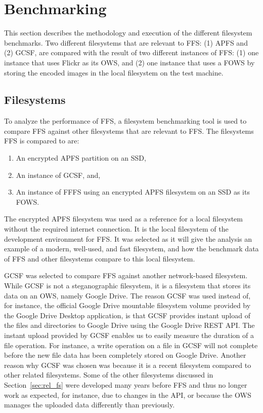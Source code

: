 \section{Benchmarking}
This section describes the methodology and execution of the different filesystem benchmarks. Two different filesystems that are relevant to \gls{FFS}: (1) \gls{APFS} and (2) \gls{GCSF}, are compared with the result of two different instances of \gls{FFS}: (1) one instance that uses Flickr as its \gls{OWS}, and (2) one instance that uses a \gls{FOWS} by storing the encoded images in the local filesystem on the test machine. 

\subsection{Filesystems}
To analyze the performance of \gls{FFS}, a filesystem benchmarking tool is used to compare \gls{FFS} against other filesystems that are relevant to \gls{FFS}. The filesystems \gls{FFS} is compared to are:
\begin{enumerate}
	\item An encrypted \gls{APFS} partition on an SSD,
	\item An instance of \gls{GCSF}, and,
	\item An instance of \gls{FFFS} using an encrypted \gls{APFS} filesystem on an SSD as its \gls{FOWS}.
\end{enumerate}
The encrypted \gls{APFS} filesystem was used as a reference for a local filesystem without the required internet connection. It is the local filesystem of the development environment for \gls{FFS}. It was selected as it will give the analysis an example of a modern, \mbox{well-used}, and fast filesystem, and how the benchmark data of \gls{FFS} and other filesystems compare to this local filesystem.

\gls{GCSF} was selected to compare \gls{FFS} against another \mbox{network-based} filesystem. While \gls{GCSF} is not a steganographic filesystem, it is a filesystem that stores its data on an \gls{OWS}, namely Google Drive. The reason \gls{GCSF} was used instead of, for instance, the official Google Drive mountable filesystem volume provided by the Google Drive Desktop application, is that \gls{GCSF} provides instant upload of the files and directories to Google Drive using the Google Drive REST \gls{API}. The instant upload provided by \gls{GCSF} enables us to easily measure the duration of a file operation. For instance, a write operation on a file in \gls{GCSF} will not complete before the new file data has been completely stored on Google Drive. Another reason why \gls{GCSF} was chosen was because it is a recent filesystem compared to other related filesystems. Some of the other filesystems discussed in Section~\ref{sec:rel_fs} were developed many years before \gls{FFS} and thus no longer work as expected, for instance, due to changes in the \gls{API}, or because the \gls{OWS} manages the uploaded data differently than previously.

